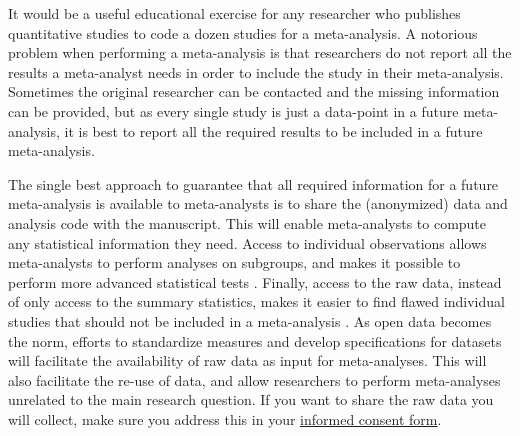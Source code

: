 \documentclass[
  oneside]{krantz}
\begin{document}
It would be a useful educational exercise for any researcher who publishes quantitative studies to code a dozen studies for a meta-analysis. A notorious problem when performing a meta-analysis is that researchers do not report all the results a meta-analyst needs in order to include the study in their meta-analysis. Sometimes the original researcher can be contacted and the missing information can be provided, but as every single study is just a data-point in a future meta-analysis, it is best to report all the required results to be included in a future meta-analysis.

The single best approach to guarantee that all required information for a future meta-analysis is available to meta-analysts is to share the (anonymized) data and analysis code with the manuscript. This will enable meta-analysts to compute any statistical information they need. Access to individual observations allows meta-analysts to perform analyses on subgroups, and makes it possible to perform more advanced statistical tests \citep{stewart_ipd_2002}. Finally, access to the raw data, instead of only access to the summary statistics, makes it easier to find flawed individual studies that should not be included in a meta-analysis \citep{lawrence_lesson_2021}. As open data becomes the norm, efforts to standardize measures and develop specifications for datasets will facilitate the availability of raw data as input for meta-analyses. This will also facilitate the re-use of data, and allow researchers to perform meta-analyses unrelated to the main research question. If you want to share the raw data you will collect, make sure you address this in your \href{https://www.uu.nl/en/research/research-data-management/guides/informed-consent-for-data-sharing}{informed consent form}.
\end{document}
